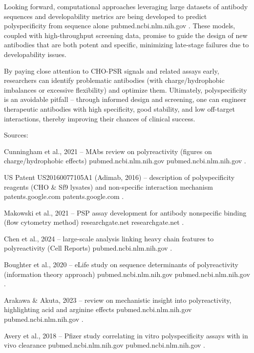 Looking forward, computational approaches leveraging large datasets of antibody sequences and developability metrics are being developed to predict polyspecificity from sequence alone
pubmed.ncbi.nlm.nih.gov
. These models, coupled with high-throughput screening data, promise to guide the design of new antibodies that are both potent and specific, minimizing late-stage failures due to developability issues.

By paying close attention to CHO-PSR signals and related assays early, researchers can identify problematic antibodies (with charge/hydrophobic imbalances or excessive flexibility) and optimize them. Ultimately, polyspecificity is an avoidable pitfall – through informed design and screening, one can engineer therapeutic antibodies with high specificity, good stability, and low off-target interactions, thereby improving their chances of clinical success.

Sources:

Cunningham et al., 2021 – MAbs review on polyreactivity (figures on charge/hydrophobic effects)
pubmed.ncbi.nlm.nih.gov
pubmed.ncbi.nlm.nih.gov
.

US Patent US20160077105A1 (Adimab, 2016) – description of polyspecificity reagents (CHO & Sf9 lysates) and non-specific interaction mechanism
patents.google.com
patents.google.com
.

Makowski et al., 2021 – PSP assay development for antibody nonspecific binding (flow cytometry method)
researchgate.net
researchgate.net
.

Chen et al., 2024 – large-scale analysis linking heavy chain features to polyreactivity (Cell Reports)
pubmed.ncbi.nlm.nih.gov
.

Boughter et al., 2020 – eLife study on sequence determinants of polyreactivity (information theory approach)
pubmed.ncbi.nlm.nih.gov
pubmed.ncbi.nlm.nih.gov
.

Arakawa & Akuta, 2023 – review on mechanistic insight into polyreactivity, highlighting acid and arginine effects
pubmed.ncbi.nlm.nih.gov
pubmed.ncbi.nlm.nih.gov
.

Avery et al., 2018 – Pfizer study correlating in vitro polyspecificity assays with in vivo clearance
pubmed.ncbi.nlm.nih.gov
pubmed.ncbi.nlm.nih.gov
.